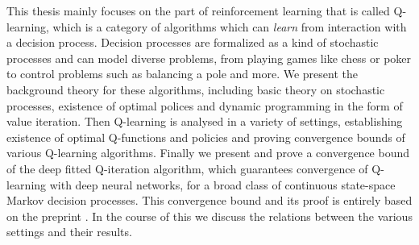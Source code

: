 
This thesis mainly focuses on the part of reinforcement learning that is called
Q-learning, which is a category of algorithms which can \emph{learn} from
interaction with a decision process.
Decision processes are formalized as a kind of stochastic processes and
can model diverse problems, from playing games like 
chess or poker to control problems such
as balancing a pole and more.
We present the background theory for these algorithms,
including basic theory on stochastic processes,
existence of optimal polices and
dynamic programming in the form of value iteration.
Then Q-learning is analysed in a variety of settings,
establishing existence of optimal Q-functions and policies
and proving convergence bounds of various Q-learning algorithms.
Finally we present and prove a convergence bound of the
deep fitted Q-iteration algorithm,
which guarantees convergence of Q-learning with deep neural networks,
for a broad class of continuous state-space Markov decision processes.
This convergence bound and its proof is entirely based on
the preprint .
In the course of this we discuss the relations between the various settings
and their results.

